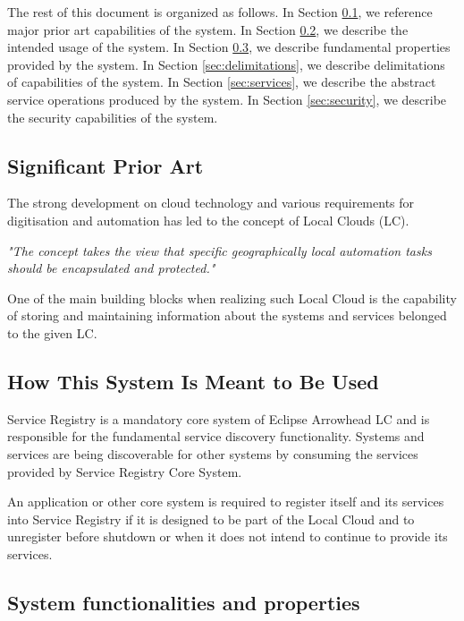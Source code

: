 \documentclass[a4paper]{arrowhead}
\begin{document}
The rest of this document is organized as follows.
In Section \ref{sec:prior_art}, we reference major prior art capabilities
of the system.
In Section \ref{sec:use}, we describe the intended usage of the system.
In Section \ref{sec:properties}, we describe fundamental properties
provided by the system.
In Section \ref{sec:delimitations}, we describe delimitations of capabilities
of the system.
In Section \ref{sec:services}, we describe the abstract service
operations produced by the system.
In Section \ref{sec:security}, we describe the security capabilities
of the system.

\newpage

\subsection{Significant Prior Art}
\label{sec:prior_art}

The strong development on cloud technology and various requirements for digitisation and automation has led to the concept of Local Clouds (LC).

\textit{"The concept takes the view that specific geographically local automation tasks should be encapsulated and protected."} \cite{jerker2017localclouds}

One of the main building blocks when realizing such Local Cloud is the capability of storing and maintaining information about the systems and services belonged to the given LC.

\subsection{How This System Is Meant to Be Used}
\label{sec:use}

Service Registry is a mandatory core system of Eclipse Arrowhead LC and is responsible for the fundamental service discovery functionality. Systems and services are being discoverable for other systems by consuming the services provided by Service Registry Core System.

An application or other core system is required to register itself and its services into Service Registry if it is designed to be part of the Local Cloud and to unregister before shutdown or when it does not intend to continue to provide its services.

\subsection{System functionalities and properties}
\label{sec:properties}
\end{document}
